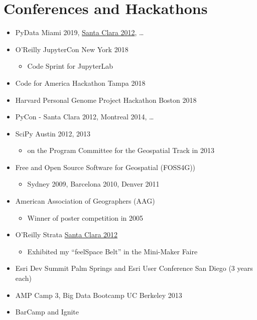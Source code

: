 \documentclass[12pt]{article}
\newenvironment{mitemize}
               {%
                 \setlength{\parskip}{3pt}
                 \setlength{\itemsep}{2.5pt plus 1pt}
                 \begin{itemize}}
               {\end{itemize}}
\begin{document}
\clearpage

\section*{Conferences and Hackathons} \hfill

\begin{mitemize}
\item PyData Miami 2019, \href{https://conferences.oreilly.com/strata/strata2012/public/schedule/detail/23166}{Santa Clara 2012}, \ldots
\item O'Reilly JupyterCon New York 2018
  \begin{mitemize}
  \item Code Sprint for JupyterLab
  \end{mitemize}
  \item Code for America Hackathon Tampa 2018
  \item Harvard Personal Genome Project Hackathon Boston 2018
  \item PyCon - Santa Clara 2012, Montreal 2014, \ldots
  \item SciPy Austin 2012, 2013
    \begin{mitemize}
    \item on the Program Committee for the Geospatial Track in 2013
    \end{mitemize}
  \item Free and Open Source Software for Geospatial (FOSS4G))
    \begin{mitemize}
    \item Sydney 2009, Barcelona 2010, Denver 2011
    \end{mitemize}
  \item American Association of Geographers (AAG)
    \begin{mitemize}
    \item Winner of poster competition in 2005
    \end{mitemize}
  \item O'Reilly Strata \href{https://conferences.oreilly.com/strata/strata2012}{Santa Clara 2012}
    \begin{mitemize}
    \item Exhibited my ``feelSpace Belt'' in the Mini-Maker Faire
    \end{mitemize}
  \item Esri Dev Summit Palm Springs and Esri User Conference San Diego (3 years each)
  \item AMP Camp 3, Big Data Bootcamp UC Berkeley 2013
  \item BarCamp and Ignite

\end{mitemize}
\end{document}
